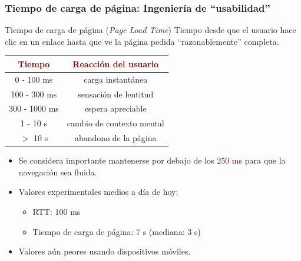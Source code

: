 \documentclass[hyperref={pdfpagelabels=true},ucs]{beamer}
\newcommand{\res}[1]{\textcolor{darkred}{#1}}
\begin{document}
\begin{frame}[fragile,shrink=5]
\frametitle{Tiempo de carga de página: Ingeniería de ``usabilidad''}

\begin{block}{Tiempo de carga de página (\emph{Page Load Time})}
Tiempo desde que el usuario hace clic en un enlace hasta que ve la
página pedida ``razonablemente'' completa.
\end{block}


\begin{center}
  \begin{tabular}{|c|c|}\hline
    \res{\textbf{Tiempo}} & \res{\textbf{Reacción del usuario}} \\\hline
    0 - 100 ms & carga instantánea \\   
    100 - 300 ms & sensación de lentitud \\   
    300 - 1000 ms & espera apreciable \\   
    1 - 10 s & cambio de contexto mental \\   
    $>$ 10 s & abandono de la página \\\hline 
  \end{tabular}
\end{center}

\begin{itemize}
\item Se considera importante mantenerse por debajo de los 
  \res{250 ms} para que la navegación sea fluida.
\item Valores experimentales medios a día de hoy:
  \begin{itemize}
  \item RTT: 100 ms
  \item Tiempo de carga de página: 7 s (mediana: 3 s)
  \end{itemize}
\item Valores aún peores usando dispositivos móviles.
\end{itemize}


\end{frame}




\end{document}
